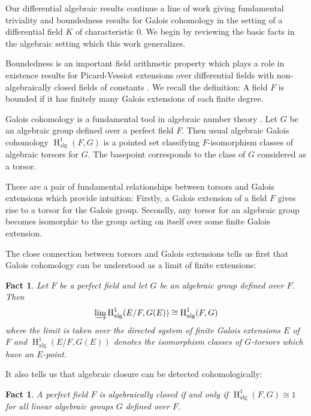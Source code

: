 \documentclass{amsart}
\newtheorem{fact}[theorem]{Fact}
\theoremstyle{definition}
\theoremstyle{remark}
\numberwithin{equation}{section}
\def \HH {\operatorname{H}}
\def \alg {\operatorname{alg}}
\begin{document}
Our differential algebraic results continue a line of work \cite{pillay_1998_DGI} 
\cite{Pillay2004}
\cite{PILLAY2017809}  \cite{Minchenko_2019} 
\cite{Chatzidakis2017GeneralizedPE}
\cite{AnandDavidComm}  giving fundamental triviality and boundedness results for Galois cohomology in the setting of a differential field $K$ of characteristic $0$. We begin by reviewing the basic facts in the algebraic setting which this work generalizes. 

Boundedness is an important field arithmetic property which plays a role in existence results for Picard-Vessiot extensions over differential fields with non-algebraically closed fields of constants \cite{KamenskyPillay}. We recall the definition: A field $F$ is bounded if it has finitely many Galois extensions of each finite degree.

Galois cohomology is a fundamental tool in algebraic number theory \cite{Serre1979}. Let $G$ be an algebraic group defined over a perfect field $F$. Then usual algebraic Galois cohomology $\HH^1_{\alg}(F,G)$ is a pointed set classifying $F$-isomorphism classes of algebraic torsors for $G$. The basepoint corresponds to the class of $G$ considered as a torsor. 

There are a pair of fundamental relationships between torsors and Galois extensions which provide intuition: Firstly, a Galois extension of a field $F$ gives rise to a torsor for the Galois group. Secondly, any torsor for an algebraic group becomes isomorphic to the group acting on itself over some finite Galois extension. 

The close connection between torsors and Galois extensions tells us first that Galois cohomology can be understood as a limit of finite extensions:

\begin{fact}\label{fact: alg colim}\cite{Serre1979}
    Let $F$ be a perfect field and let $G$ be an algebraic group defined over $F$. Then $$\varinjlim \HH^1_{\alg}(E/F,G(E)) \cong \HH^1_{\alg}(F,G)$$ where the limit is taken over the directed system of finite Galois extensions $E$ of $F$ and $\HH^1_{\alg}(E/F,G(E))$ denotes the isomorphism classes of $G$-torsors which have an $E$-point. 
\end{fact} 

It also tells us that algebraic closure can be detected cohomologically:

\begin{fact}\cite{Serre1979}\label{fact: alg colim}
    A perfect field $F$ is algebraically closed if and only if $\HH^1_{\alg}(F,G) \cong 1$ for all linear algebraic groups $G$ defined over $F$. 
\end{fact}
\end{document}
